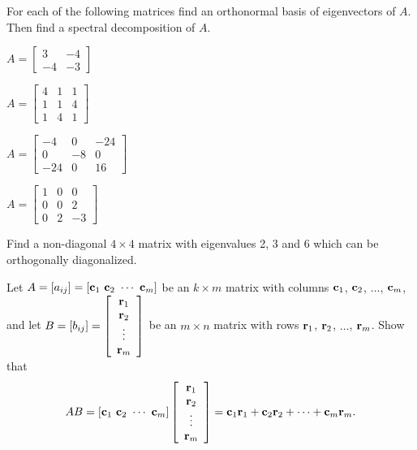 \item For each of the following matrices find an orthonormal basis of eigenvectors of $A$. Then find a spectral decomposition of $A$. 
	\ba
	\begin{minipage}{2.0in}
	\item $A = \left[ \begin{array}{rr} 3&-4 \\ -4&-3 \end{array} \right]$
	\end{minipage}
	\begin{minipage}{2.0in}
	\item $A = \left[ \begin{array}{ccc} 4&1&1 \\ 1&1&4 \\ 1&4&1 \end{array} \right]$
	\end{minipage}
	
	\begin{minipage}{2.0in}
	\item $A = \left[ \begin{array}{rrr} -4&0&-24 \\ 0&-8&0 \\ -24&0&16 \end{array} \right]$
	\end{minipage}
	\begin{minipage}{2.0in}
	\item $A = \left[ \begin{array}{ccr} 1&0&0 \\ 0&0&2 \\ 0&2&-3 \end{array} \right]$
	\end{minipage}
	\ea

\item Find a non-diagonal $4 \times 4$ matrix with eigenvalues 2, 3 and 6 which can be orthogonally diagonalized.

\item \label{ex:7_a_product} Let $A = [a_{ij}] = [ \vc_1 \ \vc_2 \ \cdots \ \vc_m]$ be an $k \times m$ matrix with columns $\mathbf{c}_1$, $\mathbf{c}_2$, $\ldots$, $\mathbf{c}_m$, and let $B = [b_{ij}] = \left[ \begin{array}{c} \mathbf{r}_1 \\ \mathbf{r}_2 \\ \vdots \\ \mathbf{r}_m \end{array} \right]$ be an $m \times n$ matrix  with rows $\mathbf{r}_1$, $\mathbf{r}_2$, $\ldots$, $\mathbf{r}_m$. Show that 
\[AB = [ \vc_1 \ \vc_2 \ \cdots \ \vc_m]\left[\begin{array}{c} \vr_1 \\ \vr_2 \\ \vdots \\ \vr_m \end{array} \right] = \vc_1\vr_1 + \vc_2\vr_2 + \cdots + \vc_m \vr_m.\]
 
